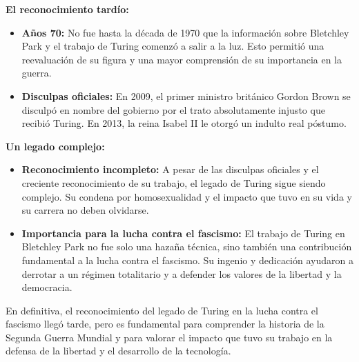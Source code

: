 \documentclass{article}
\begin{document}
\textbf{El reconocimiento tardío:}

\begin{itemize}
    \item \textbf{Años 70:} No fue hasta la década de 1970 que la información 
    sobre Bletchley Park y el trabajo de Turing comenzó a salir a la luz. Esto 
    permitió una reevaluación de su figura y una mayor comprensión de su importancia en la guerra.
    
    \item \textbf{Disculpas oficiales:} En 2009, el primer ministro británico 
    Gordon Brown se disculpó en nombre del gobierno por el trato absolutamente 
    injusto que recibió Turing. En 2013, la reina Isabel II le otorgó un indulto real póstumo.
\end{itemize}

\textbf{Un legado complejo:}

\begin{itemize}
    \item \textbf{Reconocimiento incompleto:} A pesar de las disculpas oficiales y 
    el creciente reconocimiento de su trabajo, el legado de Turing sigue siendo complejo. 
    Su condena por homosexualidad y el impacto que tuvo en su vida y su carrera no deben olvidarse.
    
    \item \textbf{Importancia para la lucha contra el fascismo:} El trabajo de Turing en 
    Bletchley Park no fue solo una hazaña técnica, sino también una contribución fundamental 
    a la lucha contra el fascismo. Su ingenio y dedicación ayudaron a derrotar a un régimen 
    totalitario y a defender los valores de la libertad y la democracia.
\end{itemize}

En definitiva, el reconocimiento del legado de Turing en la lucha contra el fascismo 
llegó tarde, pero es fundamental para comprender la historia de la Segunda Guerra Mundial 
y para valorar el impacto que tuvo su trabajo en la defensa de la libertad y el desarrollo 
de la tecnología.


\pagebreak %
\printbibliography %
\end{document}
